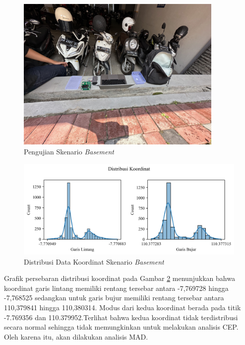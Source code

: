 \begin{figure}[H]
	\centering
	\includegraphics[width=10cm]{contents/chapter-4/1-skenario-basement/keadaan.jpg}
	\caption{Pengujian Skenario \textit{Basement}}
	\label{Fig: basement-keadaan}
\end{figure}

\begin{figure}[H]
	\centering
	\begin{adjustbox}{width=\textwidth}
		\includegraphics{contents/chapter-4/1-skenario-basement/distribution.png}
	\end{adjustbox}
	\caption{Distribusi Data Koordinat Skenario \textit{Basement}}
	\label{Fig:basement-distribution}
\end{figure}

Grafik persebaran distribusi koordinat pada Gambar \ref{Fig:basement-distribution} menunjukkan bahwa koordinat garis lintang memiliki rentang tersebar antara -7,769728 hingga -7,768525 sedangkan untuk garis bujur memiliki rentang tersebar antara 110,379841 hingga 110,380314. Modus dari kedua koordinat berada pada titik -7.769356 dan 110.379952.Terlihat bahwa kedua koordinat tidak terdistribusi secara normal sehingga tidak memungkinkan untuk melakukan analisis CEP. Oleh karena itu, akan dilakukan analisis MAD.

